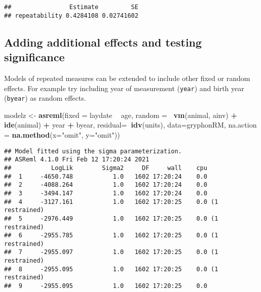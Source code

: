 \documentclass[12pt,]{book}
\newenvironment{Shaded}{\begin{snugshade}}{\end{snugshade}}
\newcommand{\DataTypeTok}[1]{\textcolor[rgb]{0.13,0.29,0.53}{#1}}
\newcommand{\KeywordTok}[1]{\textcolor[rgb]{0.13,0.29,0.53}{\textbf{#1}}}
\newcommand{\NormalTok}[1]{#1}
\newcommand{\OperatorTok}[1]{\textcolor[rgb]{0.81,0.36,0.00}{\textbf{#1}}}
\newcommand{\StringTok}[1]{\textcolor[rgb]{0.31,0.60,0.02}{#1}}
\begin{document}
\begin{verbatim}
##                Estimate         SE
## repeatability 0.4284108 0.02741602
\end{verbatim}

\hypertarget{adding-additional-effects-and-testing-significance}{%
\subsection{Adding additional effects and testing significance}\label{adding-additional-effects-and-testing-significance}}

Models of repeated measures can be extended to include other fixed or random effects. For example try including year of measurement (\texttt{year}) and birth year (\texttt{byear}) as random effects.

\begin{Shaded}
\begin{Highlighting}[]
\NormalTok{modelz <-}\StringTok{ }\KeywordTok{asreml}\NormalTok{(}\DataTypeTok{fixed =}\NormalTok{ laydate }\OperatorTok{~}\StringTok{ }\NormalTok{age,}
                 \DataTypeTok{random =}\OperatorTok{~}\StringTok{ }\KeywordTok{vm}\NormalTok{(animal, ainv) }\OperatorTok{+}\StringTok{ }\KeywordTok{ide}\NormalTok{(animal) }\OperatorTok{+}
\StringTok{                 }\NormalTok{year }\OperatorTok{+}\StringTok{ }\NormalTok{byear,}
                 \DataTypeTok{residual=}\OperatorTok{~}\KeywordTok{idv}\NormalTok{(units),}
                 \DataTypeTok{data=}\NormalTok{gryphonRM,}
                 \DataTypeTok{na.action =} \KeywordTok{na.method}\NormalTok{(}\DataTypeTok{x=}\StringTok{"omit"}\NormalTok{, }\DataTypeTok{y=}\StringTok{"omit"}\NormalTok{))}
\end{Highlighting}
\end{Shaded}

\begin{verbatim}
## Model fitted using the sigma parameterization.
## ASReml 4.1.0 Fri Feb 12 17:20:24 2021
##           LogLik        Sigma2     DF     wall    cpu
##  1     -4650.748           1.0   1602 17:20:24    0.0
##  2     -4088.264           1.0   1602 17:20:24    0.0
##  3     -3494.147           1.0   1602 17:20:24    0.0
##  4     -3127.161           1.0   1602 17:20:25    0.0 (1 restrained)
##  5     -2976.449           1.0   1602 17:20:25    0.0 (1 restrained)
##  6     -2955.785           1.0   1602 17:20:25    0.0 (1 restrained)
##  7     -2955.097           1.0   1602 17:20:25    0.0 (1 restrained)
##  8     -2955.095           1.0   1602 17:20:25    0.0 (1 restrained)
##  9     -2955.095           1.0   1602 17:20:25    0.0
\end{verbatim}
\end{document}
